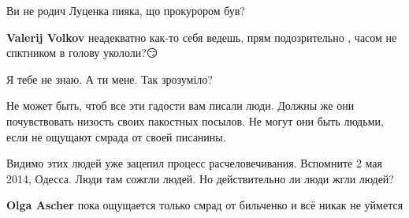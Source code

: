 \begin{itemize}
\begin{itemize}
Ви не родич Луценка пияка, що прокурором був?

 
\textbf{Valerij Volkov} неадекватно как-то себя ведешь, прям подозрительно , часом не спктником в голову укололи?😏

 
Я тебе не знаю.
А ти мене.
Так зрозуміло?
\end{itemize}

 

Не может быть, чтоб все эти гадости вам писали люди. Должны же они
почувствовать низость своих пакостных посылов. Не могут они быть людьми, если
не ощущают смрада от своей писанины.

\begin{itemize}
 
Видимо этих людей уже зацепил процесс расчеловечивания.
Вспомните 2 мая 2014, Одесса. Люди там сожгли людей.
Но действительно ли люди жгли людей?

 
\textbf{Olga Ascher} пока ощущается только смрад от бильченко и всё никак не уймется

 

\end{itemize}
\end{itemize}

